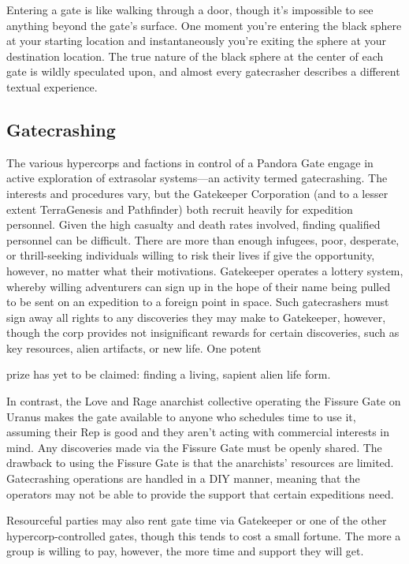 Entering a gate is like walking through a door, though it's impossible to see anything beyond the gate's surface. One moment you're entering the black sphere at your starting location and instantaneously you're exiting the sphere at your destination location. The true nature of the black sphere at the center of each gate is wildly speculated upon, and almost every gatecrasher describes a different textual experience. 

\subsection{Gatecrashing} 

The various hypercorps and factions in control of a Pandora Gate engage in active exploration of extrasolar systems—an activity termed gatecrashing. The interests and procedures vary, but the Gatekeeper Corporation (and to a lesser extent TerraGenesis and Pathfinder) both recruit heavily for expedition personnel. Given the high casualty and death rates involved, finding qualified personnel can be difficult. There are more than enough infugees, poor, desperate, or thrill-seeking individuals willing to risk their lives if give the opportunity, however, no matter what their motivations. Gatekeeper operates a lottery system, whereby willing adventurers can sign up in the hope of their name being pulled to be sent on an expedition to a foreign point in space. Such gatecrashers must sign away all rights to any discoveries they may make to Gatekeeper, however, though the corp provides not insignificant rewards for certain discoveries, such as key resources, alien artifacts, or new life. One potent 

prize has yet to be claimed: finding a living, sapient alien life form. 

In contrast, the Love and Rage anarchist collective operating the Fissure Gate on Uranus makes the gate available to anyone who schedules time to use it, assuming their Rep is good and they aren't acting with commercial interests in mind. Any discoveries made via the Fissure Gate must be openly shared. The drawback to using the Fissure Gate is that the anarchists' resources are limited. Gatecrashing operations are handled in a DIY manner, meaning that the operators may not be able to provide the support that certain expeditions need. 

Resourceful parties may also rent gate time via Gatekeeper or one of the other hypercorp-controlled gates, though this tends to cost a small fortune. The more a group is willing to pay, however, the more time and support they will get. 

